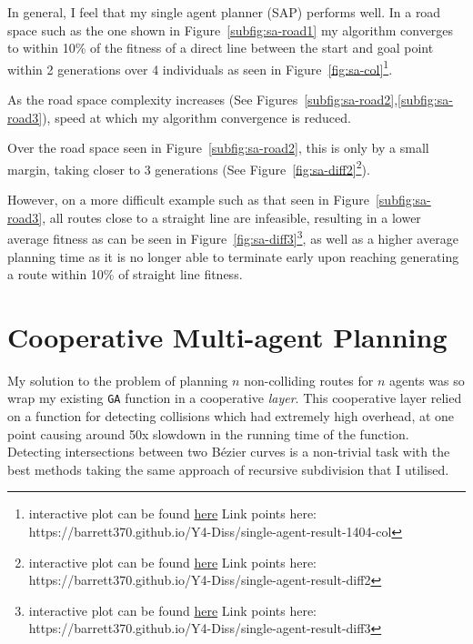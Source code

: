 
In general, I feel that my single agent planner (SAP) performs well. In a road space such as the one shown in Figure~\ref{subfig:sa-road1} my algorithm converges to within 10\% of the fitness of a direct line between the start and goal point within 2 generations over 4 individuals as seen in Figure~\ref{fig:sa-col}\footnote{interactive plot can be found \href{https://barrett370.github.io/Y4-Diss/single-agent-result-1404-col}{here} Link points here: https://barrett370.github.io/Y4-Diss/single-agent-result-1404-col}.

As the road space complexity increases (See Figures~\ref{subfig:sa-road2},\ref{subfig:sa-road3}), speed at which my algorithm convergence is reduced.

Over the road space seen in Figure~\ref{subfig:sa-road2}, this is only by a small margin, taking closer to 3 generations (See Figure~\ref{fig:sa-diff2}\footnote{interactive plot can be found \href{https://barrett370.github.io/Y4-Diss/single-agent-result-diff2}{here} Link points here: https://barrett370.github.io/Y4-Diss/single-agent-result-diff2}).

However, on a more difficult example such as that seen in Figure~\ref{subfig:sa-road3}, all routes close to a straight line are infeasible, resulting in a lower average fitness as can be seen in Figure~\ref{fig:sa-diff3}\footnote{interactive plot can be found \href{https://barrett370.github.io/Y4-Diss/single-agent-result-diff3}{here} Link points here: https://barrett370.github.io/Y4-Diss/single-agent-result-diff3}, as well as a higher average planning time as it is no longer able to terminate early upon reaching generating a route within 10\% of straight line fitness.


\section{Cooperative Multi-agent Planning}
\label{subsec:eval-cooperativeplanning}

My solution to the problem of planning $n$ non-colliding routes for $n$ agents was so wrap my existing \texttt{GA} function in a cooperative \textit{layer}. This cooperative layer relied on a function for detecting collisions which had extremely high overhead, at one point causing around 50x slowdown in the running time of the function. Detecting intersections between two Bézier curves is a non-trivial task with the best methods taking the same approach of recursive subdivision that I utilised.

